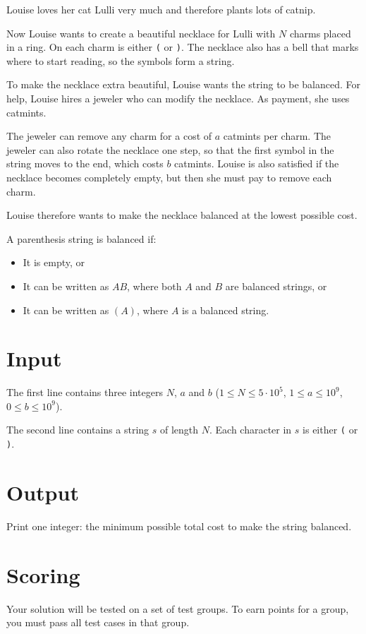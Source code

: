 \noindent

Louise loves her cat Lulli very much and therefore plants lots of catnip.

Now Louise wants to create a beautiful necklace for Lulli with $N$ charms placed in a ring.
On each charm is either \texttt{(} or \texttt{)}.
The necklace also has a bell that marks where to start reading, so the symbols form a string.

To make the necklace extra beautiful, Louise wants the string to be balanced.
For help, Louise hires a jeweler who can modify the necklace. As payment, she uses catmints.

The jeweler can remove any charm for a cost of $a$ catmints per charm.
The jeweler can also rotate the necklace one step, so that the first symbol in the string moves to the end, which costs $b$ catmints.
Louise is also satisfied if the necklace becomes completely empty, but then she must pay to remove each charm.

Louise therefore wants to make the necklace balanced at the lowest possible cost.

A parenthesis string is balanced if:
\begin{itemize}
    \item It is empty, or
    \item It can be written as $AB$, where both $A$ and $B$ are balanced strings, or
    \item It can be written as $(A)$, where $A$ is a balanced string.
\end{itemize}


\section*{Input}
The first line contains three integers $N$, $a$ and $b$ ($1 \leq N \leq 5 \cdot 10^5$, $1 \leq a \leq 10^9$, $0 \leq b \leq 10^9$).

The second line contains a string $s$ of length $N$.
Each character in $s$ is either \texttt{(} or \texttt{)}.

\section*{Output}
Print one integer: the minimum possible total cost to make the string balanced.


\section*{Scoring}
Your solution will be tested on a set of test groups.
To earn points for a group, you must pass all test cases in that group.

